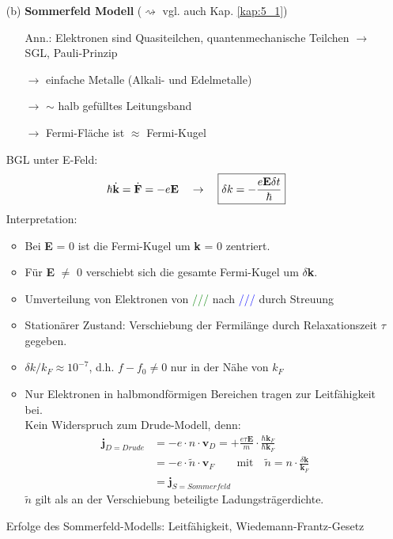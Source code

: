 \begin{itemize}
\item[(b)] \textbf{Sommerfeld Modell} ($\rightsquigarrow$ vgl. auch Kap. \ref{kap:5_1})
\begin{itemize}
    \item[Ann.:] Elektronen sind Quasiteilchen, quantenmechanische Teilchen $\rightarrow$ SGL, Pauli-Prinzip
    \item[$\rightarrow$] einfache Metalle (Alkali- und Edelmetalle)
    \item[$\rightarrow$] $\sim$ halb gefülltes Leitungsband
    \item[$\rightarrow$] Fermi-Fläche ist $\approx$ Fermi-Kugel
\end{itemize}
BGL unter E-Feld:
\begin{align*}
    \hbar \dot{\textbf{k}} = \dot{\textbf{F}} = - e \textbf{E} \quad \rightarrow \quad \text{\fbox{$\delta k = - \frac{e \textbf{E} \delta t}{\hbar}$}}
\end{align*}
Interpretation:
\begin{itemize}
    \item Bei \textbf{E} = 0 ist die Fermi-Kugel um \textbf{k} = 0 zentriert.
    \item Für \textbf{E} $\neq$ 0 verschiebt sich die gesamte Fermi-Kugel um $\delta$\textbf{k}.
\end{itemize}
\begin{itemize}
    \item Umverteilung von Elektronen von \textcolor{green}{///} nach \textcolor{blue}{///} durch Streuung
    \item Stationärer Zustand: Verschiebung der Fermilänge durch Relaxationszeit $\tau$ gegeben.
    \begin{center}
    \end{center}
    \item $\delta k / k_F \approx 10^{-7}$, d.h. $f-f_0 \neq 0$ nur in der Nähe von $k_F$
    \item Nur Elektronen in halbmondförmigen Bereichen tragen zur Leitfähigkeit bei.\\
    Kein Widerspruch zum Drude-Modell, denn:
    \begin{align*}
        \textbf{j}_{D = Drude} &= - e \cdot n \cdot \textbf{v}_D = + \frac{e \tau \textbf{E}}{m} \cdot \frac{\hbar \textbf{k}_F}{\hbar \textbf{k}_F}\\
        &= -e \cdot \tilde{n}\cdot \textbf{v}_F \qquad \text{mit} \quad \tilde{n} = n \cdot \frac{\delta \textbf{k}}{\textbf{k}_F}\\
        &= \textbf{j}_{S = Sommerfeld}
    \end{align*}
    $\tilde{n}$ gilt als an der Verschiebung beteiligte Ladungsträgerdichte.
\end{itemize}

Erfolge des Sommerfeld-Modells: Leitfähigkeit, Wiedemann-Frantz-Gesetz

\end{itemize}
